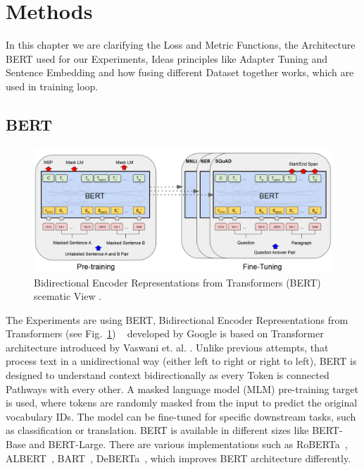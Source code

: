 \section{Methods}\label{sec:methods}
In this chapter we are clarifying the Loss and Metric Functions, the Architecture BERT used for our Experiments, Ideas principles like Adapter Tuning and
Sentence Embedding and how fusing different Dataset together works, which are used in training loop.


\subsection{BERT}
\begin{figure}[h]
    \centering
    \includegraphics[scale=0.33]{./content/BERT_Architecture.png}
    \caption{Bidirectional Encoder Representations from Transformers (BERT) 
             scematic View \cite{devlin_bert_2019}.}
    \label{tab:bert}
\end{figure}

The Experiments are using BERT, Bidirectional Encoder Representations from Transformers (see Fig.~\ref{tab:bert}) ~\cite{devlin_bert_2019} 
developed by Google is based on Transformer architecture introduced by Vaswani et. al. \cite{vaswani_attention_2023}.
Unlike previous attempts, that process text in a unidirectional way (either left to right or right to 
left), BERT is designed to understand context bidirectionally as every Token is connected Pathways with every other. A masked language model (MLM) 
pre-training target is used, where tokens are randomly masked from the input to predict the original 
vocabulary IDs.
The model can be fine-tuned for specific downstream tasks, such as classification or translation. 
BERT is available in different sizes like BERT-Base and BERT-Large. There are various implementations 
such as RoBERTa~\cite{liu_roberta_2019}, ALBERT~\cite{lan_albert_2020}, BART~\cite{lewis_bart_2020}, 
DeBERTa~\cite{he_deberta_2021}, which improves BERT architecture differently.














